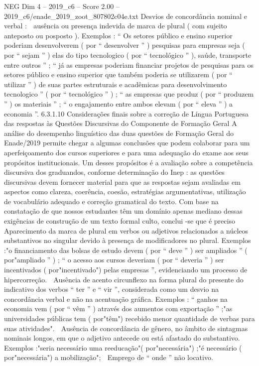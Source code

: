 \begin{textsample}{NEG Dim 4 – 2019\_c6 – Score 2.00 – 2019\_c6/enade\_2019\_zoot\_807802c04e.txt}
Desvios de concordância nominal e verbal :  ausência ou presença indevida de marca de plural ( com sujeito anteposto ou posposto ).
Exemplos : “ Os setores público e ensino superior poderiam desenvolverem ( por “ desenvolver ” ) pesquisas para empresas seja ( por “ sejam ” ) elas do tipo tecnologico ( por “ tecnológico ” ), saúde, transporte entre outros ” ; “ já as empresas poderiam financiar projetos de pesquisas para os setores público e ensino superior que também poderia se utilizarem ( por “ utilizar ” ) de suas partes estruturais e acadêmicas para desenvolvimento tecnologico ” ( por “ tecnológico ” ) ; “ as empresas que produz ( por “ produzem ” ) os materiais ” ; “ o engajamento entre ambos elevam ( por “ eleva ” ) a economia ”. 6.3.1.10 Considerações finais sobre a correção de Língua Portuguesa das respostas às Questões Discursivas do Componente de Formação Geral A análise do desempenho linguístico das duas questões de Formação Geral do Enade/2019 permite chegar a algumas conclusões que podem colaborar para um aperfeiçoamento dos cursos superiores e para uma adequação do exame aos seus propósitos institucionais.
Um desses propósitos é a avaliação sobre a competência discursiva dos graduandos, conforme determinação do Inep : as questões discursivas devem fornecer material para que as respostas sejam avaliadas em aspectos como clareza, coerência, coesão, estratégias argumentativas, utilização de vocabulário adequado e correção gramatical do texto.
Com base na constatação de que nossos estudantes têm um domínio apenas mediano dessas exigências de construção de um texto formal culto, conclui -se que é preciso  Aparecimento da marca de plural em verbos ou adjetivos relacionados a núcleos substantivos no singular devido à presença de modificadores no plural.
Exemplos :"o financiamento das bolsas de estudo devem ( por “ deve ” ) ser ampliados ” ( por"ampliado ” ) ; “ o acesso aos cursos deveriam ( por “ deveria ” ) ser incentivados ( por"incentivado") pelas empresas ”, evidenciando um processo de hipercorreção.  Ausência de acento circunflexo na forma plural do presente do indicativo dos verbos “ ter ” e “ vir ”, considerada como um desvio na concordância verbal e não na acentuação gráfica.
Exemplos : “ ganhos na economia vem ( por “ vêm ” ) através dos aumentos com exportação ” ;"as universidades públicas tem ( por"têm") recebido menor quantidade de verbas para suas atividades".  Ausência de concordância de gênero, no âmbito de sintagmas nominais longos, em que o adjetivo antecede ou está afastado do substantivo.
Exemplos :"seria necessário uma reeducação"( por"necessária") ;"é necessário ( por"necessária") a mobilização";  Emprego de “ onde ” não locativo.

\end{textsample}
